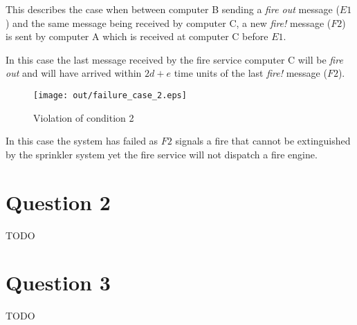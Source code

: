 \documentclass[twocolumn]{article}
\begin{document}
This describes the case when between computer B sending a \textit{fire out}
message ($E1$) and the same message being received by computer C, a new
\textit{fire!} message ($F2$) is sent by computer A which is received at
computer C before $E1$.

In this case the last message received by the fire service computer C will be
\textit{fire out} and will have arrived within $2d + e$ time units of the last
\textit{fire!} message ($F2$).

\begin{figure}[h!]
  \centering
  \texttt{[image: out/failure\_case\_2.eps]}
  \caption{Violation of condition 2}
  \label{fig:failure_case_2}
\end{figure}

In this case the system has failed as $F2$ signals a fire that cannot be
extinguished by the sprinkler system yet the fire service will not dispatch a
fire engine.

\section{Question 2}

TODO

\section{Question 3}

TODO
\end{document}
